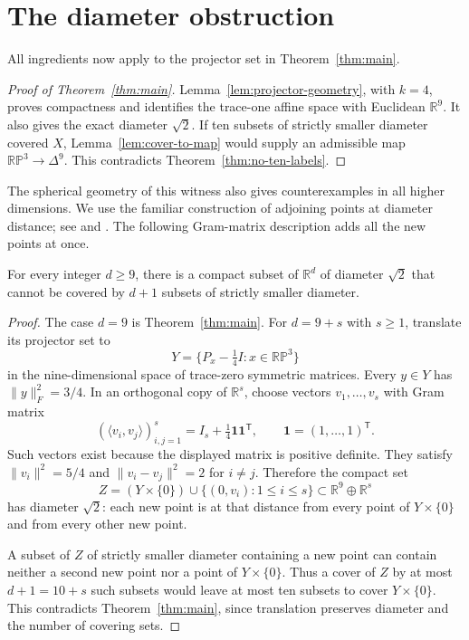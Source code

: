 \section{The diameter obstruction}
\label{sec:conclusion}

All ingredients now apply to the projector set in Theorem~\ref{thm:main}.

\begin{proof}[Proof of Theorem~\ref{thm:main}]
Lemma~\ref{lem:projector-geometry}, with $k=4$, proves compactness and
identifies the trace-one affine space with Euclidean $\mathbb R^9$.
It also gives the exact diameter $\sqrt2$. If ten subsets of strictly
smaller diameter covered $X$, Lemma~\ref{lem:cover-to-map} would supply
an admissible map $\mathbb{RP}^3\to\Delta^9$. This contradicts
Theorem~\ref{thm:no-ten-labels}.
\end{proof}

The spherical geometry of this witness also gives counterexamples in
all higher dimensions. We use the familiar construction of adjoining
points at diameter distance; see
\cite[Lemma~9]{HinrichsRichter2003} and
\cite[proof of Corollary~1]{Bondarenko2014}. The following Gram-matrix
description adds all the new points at once.

\begin{corollary}\label{cor:higher-dimensions}
For every integer $d\geq9$, there is a compact subset of $\mathbb R^d$
of diameter $\sqrt2$ that cannot be covered by $d+1$ subsets of
strictly smaller diameter.
\end{corollary}

\begin{proof}
The case $d=9$ is Theorem~\ref{thm:main}. For $d=9+s$ with $s\geq1$,
translate its projector set to
\[
 Y=\{P_x-\tfrac14 I:x\in\mathbb{RP}^3\}
\]
in the nine-dimensional space of trace-zero symmetric matrices.
Every $y\in Y$ has $\|y\|_F^2=3/4$. In an orthogonal copy of
$\mathbb R^s$, choose vectors $v_1,\ldots,v_s$ with Gram matrix
\[
 (\langle v_i,v_j\rangle)_{i,j=1}^s
 =I_s+\tfrac14\mathbf1\mathbf1^{\mathsf T},
 \qquad \mathbf1=(1,\ldots,1)^{\mathsf T}.
\]
Such vectors exist because the displayed matrix is positive definite.
They satisfy $\|v_i\|^2=5/4$ and
$\|v_i-v_j\|^2=2$ for $i\ne j$. Therefore the compact set
\[
 Z=(Y\times\{0\})\cup\{(0,v_i):1\leq i\leq s\}
 \subset\mathbb R^9\oplus\mathbb R^s
\]
has diameter $\sqrt2$: each new point is at that distance from every
point of $Y\times\{0\}$ and from every other new point.

A subset of $Z$ of strictly smaller diameter containing a new point
can contain neither a second new point nor a point of $Y\times\{0\}$.
Thus a cover of $Z$ by at most $d+1=10+s$ such subsets would leave
at most ten subsets to cover $Y\times\{0\}$. This contradicts
Theorem~\ref{thm:main}, since translation preserves diameter and the
number of covering sets.
\end{proof}
